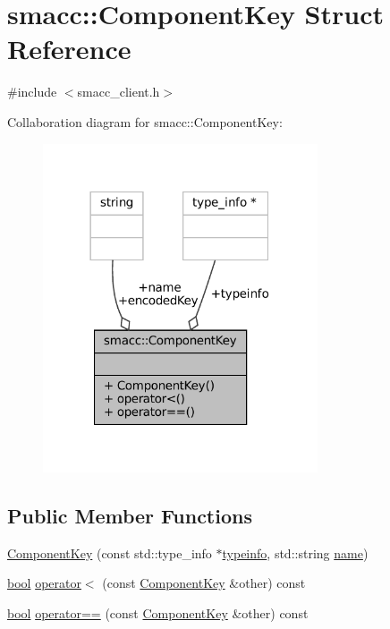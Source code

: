 \hypertarget{structsmacc_1_1ComponentKey}{}\section{smacc\+:\+:Component\+Key Struct Reference}
\label{structsmacc_1_1ComponentKey}


{\ttfamily \#include $<$smacc\+\_\+client.\+h$>$}



Collaboration diagram for smacc\+:\+:Component\+Key\+:
\nopagebreak
\begin{figure}[H]
\begin{center}
\leavevmode
\includegraphics[width=230pt]{structsmacc_1_1ComponentKey__coll__graph}
\end{center}
\end{figure}
\subsection*{Public Member Functions}
\begin{DoxyCompactItemize}
\item 
\hyperlink{structsmacc_1_1ComponentKey_a72c4c29bb7126f5f688a049419cbf0f1}{Component\+Key} (const std\+::type\+\_\+info $\ast$\hyperlink{structsmacc_1_1ComponentKey_a148bab7ba01039d4bcabfd93529b333a}{typeinfo}, std\+::string \hyperlink{structsmacc_1_1ComponentKey_ad38f21bde4dad1dd3c143bdc42e6f30d}{name})
\item 
\hyperlink{classbool}{bool} \hyperlink{structsmacc_1_1ComponentKey_a3e38f2057ef1d25e518a52a0d2165b75}{operator$<$} (const \hyperlink{structsmacc_1_1ComponentKey}{Component\+Key} \&other) const
\item 
\hyperlink{classbool}{bool} \hyperlink{structsmacc_1_1ComponentKey_a6d5bfba42edb0463512b27e273cfe47e}{operator==} (const \hyperlink{structsmacc_1_1ComponentKey}{Component\+Key} \&other) const
\end{DoxyCompactItemize}
